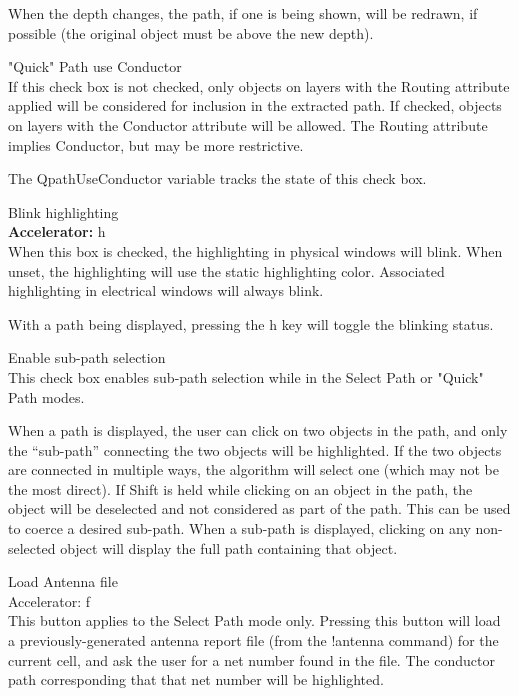 \begin{description}
When the depth changes, the path, if one is being shown, will be
redrawn, if possible (the original object must be above the new
depth).

\item{\cb "Quick" Path use Conductor}\\
If this check box is not checked, only objects on layers with the {\et
Routing} attribute applied will be considered for inclusion in the
extracted path.  If checked, objects on layers with the {\et
Conductor} attribute will be allowed.  The {\et Routing} attribute
implies {\et Conductor}, but may be more restrictive.

The {\et QpathUseConductor} variable tracks the state of this check
box.

\item{\cb Blink highlighting}\\
{\bf Accelerator:} {\kb h}\\
When this box is checked, the highlighting in physical windows will
blink.  When unset, the highlighting will use the static highlighting
color.  Associated highlighting in electrical windows will always
blink.

With a path being displayed, pressing the {\kb h} key will toggle the
blinking status.

\item{\cb Enable sub-path selection}\\
This check box enables sub-path selection while in the {\cb Select
Path} or {\cb "Quick" Path} modes.

When a path is displayed, the user can click on two objects in the
path, and only the ``sub-path'' connecting the two objects will be
highlighted.  If the two objects are connected in multiple ways, the
algorithm will select one (which may not be the most direct).  If {\kb
Shift} is held while clicking on an object in the path, the object
will be deselected and not considered as part of the path.  This can
be used to coerce a desired sub-path.  When a sub-path is displayed,
clicking on any non-selected object will display the full path
containing that object.

\item{\cb Load Antenna file}\\
{\cb Accelerator:} {\kb f}\\
This button applies to the {\cb Select Path} mode only.  Pressing this
button will load a previously-generated antenna report file (from the
{\cb !antenna} command) for the current cell, and ask the user for a
net number found in the file.  The conductor path corresponding that
that net number will be highlighted.


\end{description}
